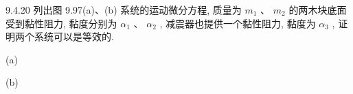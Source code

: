 \begin{problem}{9.4.20}
列出图 9.97(a)、(b) 系统的运动微分方程, 质量为 $m_{1}$ 、 $m_{2}$ 的两木块底面受到黏性阻力, 黏度分别为 $\alpha_{1}$ 、 $\alpha_{2}$ , 减震器也提供一个黏性阻力, 黏度为 $\alpha_{3}$ , 证明两个系统可以是等效的.

(a)

(b)
\begin{center}

\end{center}
\begin{center}

\end{center}
\end{problem}
\clearpage


